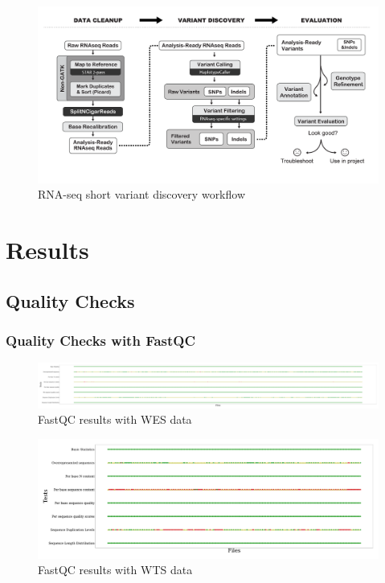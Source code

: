 \documentclass[11pt,a4paper,onecolumn,oneside]{report}
\begin{document}
            \begin{figure}[p]
                \centering
                \includegraphics[width=0.8 \linewidth]{figures/Workflow/RNA_short_variant.png}
                \caption{RNA-seq short variant discovery workflow \protect\cite{gatk1, gatk2}}
                \label{fig:workflow-RNA}
            \end{figure}
    \newpage

    \section{Results}
        \subsection{Quality Checks}
            \subsubsection{Quality Checks with FastQC}
                \begin{figure}[p]
                    \centering
                    \includegraphics[width=0.8 \linewidth]{figures/FastQC/FastQC_WES.pdf}
                    \caption{FastQC results with WES data}
                    \label{fig:fastqc-WES}
                \end{figure}

                \begin{figure}[p]
                    \centering
                    \includegraphics[width=0.8 \linewidth]{figures/FastQC/FastQC_WTS.pdf}
                    \caption{FastQC results with WTS data}
                    \label{fig:fastqc-WTS}
                \end{figure}
\end{document}
